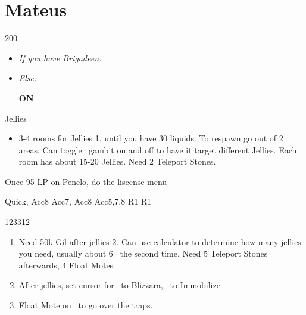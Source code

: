 \chapter{Mateus}

\begin{shop}{200}
\end{shop}
\begin{gambit}
\begin{itemize}
\item \textit{If you have Brigadeen:}
\begin{itemize}
\end{itemize}
\item \textit{Else:}
\begin{itemize}
\vaanf \textbf{ON}
\end{itemize}
\end{itemize}
\end{gambit}
\begin{battle}{Jellies}
\begin{itemize}
\item 3-4 rooms for Jellies 1, until you have 30 liquids. To respawn go out of 2 areas. Can toggle \ashe\ gambit on and off to have it target different Jellies. Each room has about 15-20 Jellies. Need 2 Teleport Stones.
\end{itemize}
\end{battle}
\begin{liscense}
Once 95 LP on Penelo, do the liscense menu

					Quick, Acc8
				Acc7, Acc8	
Acc5,7,8				R1	R1
\end{liscense}
\begin{shop}{123312}
\end{shop}
\begin{enumerate}
\item Need 50k Gil after jellies 2. Can use calculator to determine how many jellies you need, usually about 6~ the second time. Need 5 Teleport Stones afterwards, 4 Float Motes
\item After jellies, set cursor for \ashe\ to Blizzara, \penelo\ to Immobilize
\item Float Mote on \vaan\ to go over the traps.
\end{enumerate}
